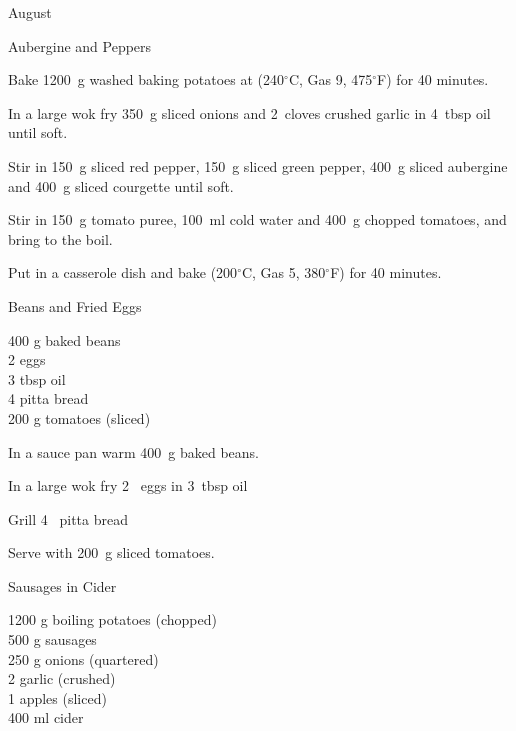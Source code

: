 \begin{menu}{August}
\begin{recipe}{2}{Aubergine and Peppers}
    \begin{instructions}
    \item 
    Bake
    1200~g washed baking potatoes
    at
    (240$^{\circ}$C, Gas 9, 475$^{\circ}$F) for 40 minutes.
  \item 
        In a large wok fry
        350~g sliced onions
        and
        2~cloves crushed garlic
        in
        4~tbsp  oil
        until soft.
      \item 
        Stir in
        150~g sliced red pepper,
        150~g sliced green pepper,
        400~g sliced aubergine
        and
        400~g sliced courgette
        until soft.
      \item 
        Stir in
        150~g  tomato puree,
        100~ml  cold water
        and
        400~g chopped tomatoes,
        and bring to the boil.
      \item 
        Put in a casserole dish and bake (200$^{\circ}$C, Gas 5, 380$^{\circ}$F) for 40 minutes.
      
    \end{instructions}
    \end{recipe}%
  
    \begin{recipe}{1}{Beans and Fried Eggs}%
		\begin{ingredients}
		400 g baked beans  \\
	2  eggs  \\
	3 tbsp oil  \\
	4  pitta bread  \\
	200 g tomatoes (sliced) \\
	
		\end{ingredients}
	
	
    \begin{instructions}
    \item 
        In a sauce pan warm
        400~g  baked beans.
      \item 
        In a large wok fry
        2~  eggs
        in
        3~tbsp  oil\item 
        Grill
        4~  pitta bread\item 
        Serve with 200~g sliced tomatoes.
      
    \end{instructions}
    \end{recipe}%
  
    \begin{recipe}{2}{Sausages in Cider}%
		\begin{ingredients}
		1200 g boiling potatoes (chopped) \\
	500 g sausages  \\
	250 g onions (quartered) \\
	2  garlic (crushed) \\
	1  apples (sliced) \\
	400 ml cider  \\
	

\end{ingredients}
\end{recipe}
\end{menu}
